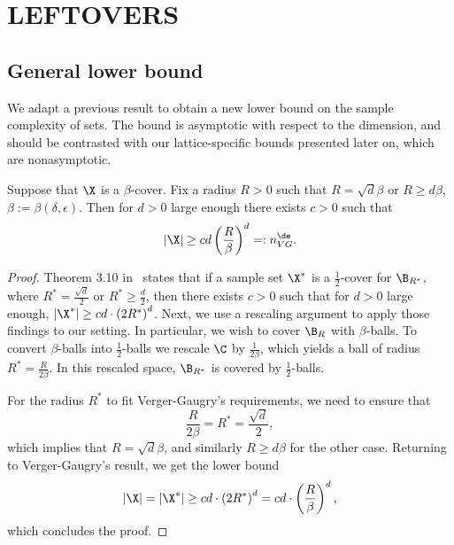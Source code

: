 \section{LEFTOVERS}

\subsection{General lower bound}
We adapt a previous result to obtain a new lower bound on the sample complexity of \decomp sets. The bound is asymptotic with respect to the dimension, and should be contrasted with our lattice-specific bounds presented later on, which are nonasymptotic. %

\begin{lemma}\label{thm:sample_lower}
  Suppose that $\X$ is a  $\beta$-cover. Fix a radius $R>0$ such that  $R=\sqrt{d}\beta$ or $R\geq d\beta$, $\beta:=\beta\left(\delta,\epsilon\right)$. Then for $d>0$ large enough there exists $c>0$ such that 
    \begin{equation}\label{eq:general_LB}
        |\X| \geq   cd\left(\frac{R}{\beta}\right)^d =: n_{VG}^{\de}.
    \end{equation}
\end{lemma}

\begin{proof}
Theorem 3.10 in~\cite{verger2005covering} states that if a sample set $\X^*$ is a $\frac{1}{2}$-cover for $\B_{R^*}$, where $R^*=\frac{\sqrt{d}}{2}$ or $R^*\geq\frac{d}{2}$, then there exists $c>0$ such that for $d>0$ large enough, $|\X^*|\geq cd\cdot \left(2R^*\right)^d$. Next, we use a rescaling argument to apply those findings to our setting. In particular, we wish to cover $\B_R$ with $\beta$-balls. To convert $\beta$-balls into $\frac{1}{2}$-balls we rescale $\C$ by $\frac{1}{2\beta}$, which yields a ball of radius $R^*=\frac{R}{2\beta}$. In this rescaled space, $\B_{R^*}$ is covered by $\frac{1}{2}$-balls. 

For the radius $R^*$ to fit Verger-Gaugry's requirements, we need to ensure that
\[
    \frac{R}{2\beta} = R^* = \frac{\sqrt{d}}{2},
\]
which implies that $R=\sqrt{d}\beta$, 
and similarly  %
$R\geq d\beta$ for the other case. Returning to Verger-Gaugry's result, we get the lower bound
\[
    |\X|=|\X^*| \geq cd\cdot \left(2R^*\right)^d = cd\cdot \left(\frac{R}{\beta}\right)^d,
\]
which concludes the proof. %
\end{proof}

